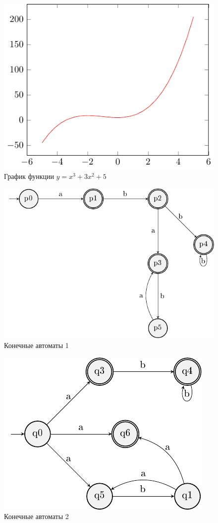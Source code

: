 	\begin{figure}[h!]
		\centering
		\includegraphics{./images/task3}
		\caption{График функции $y=x^3 + 3x^2 + 5$}
	\end{figure}
	\begin{figure}[h!]
		\centering
		\includegraphics{./images/task4_1}
		\caption{Конечные автоматы 1}
	\end{figure}
	\begin{figure}[h!]
		\centering
		\includegraphics{./images/task4_2}
		\caption{Конечные автоматы 2}
	\end{figure}
